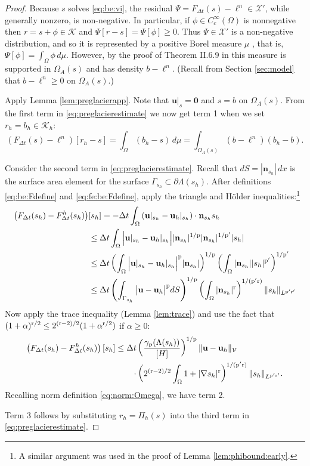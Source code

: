 \documentclass[hidelinks,onefignum,onetabnum,final]{siamart220329}  %
\newcommand{\grad}{\nabla}
\newcommand{\bn}{\mathbf{n}}
\newcommand{\bu}{\mathbf{u}}
\newcommand{\bzero}{\bm{0}}
\newcommand{\cK}{\mathcal{K}}
\newcommand{\cV}{\mathcal{V}}
\newcommand{\cX}{\mathcal{X}}
\newcommand{\pp}{{\text{\textnormal{p}}}}
\newcommand{\rr}{{\text{\textnormal{r}}}}
\begin{document}
\begin{proof}  Because $s$ solves \eqref{eq:be:vi}, the residual $\Psi = F_{\Delta t}(s)-\ell^n \in \cX'$, while generally nonzero, is non-negative.  In particular, if $\phi\in C_c^\infty(\Omega)$ is nonnegative then $r=s+\phi \in \cK$ and $\Psi[r-s] = \Psi[\phi] \ge 0$.  Thus $\Psi\in\cX'$ is a non-negative distribution, and so it is represented by a positive Borel measure $\mu$ \cite[Theorem 6.22]{LiebLoss1997}, that is, $\Psi[\phi] = \int_\Omega \phi\,d\mu$.  However, by the proof of Theorem II.6.9 in \cite{KinderlehrerStampacchia1980} this measure is supported in $\Omega_A(s)$ and has density $b-\ell^n$.  (Recall from Section \ref{sec:model} that $b-\ell^n\ge 0$ on $\Omega_A(s)$.)

Apply Lemma \ref{lem:preglacierapp}.  Note that $\bu|_{s}=\bzero$ and $s=b$ on $\Omega_A(s)$.  From the first term in \eqref{eq:preglacierestimate} we now get term 1 when we set $r_h = b_h \in \cK_h$:
\begin{equation}
\left(F_{\Delta t}(s)-\ell^n\right)[r_h-s] = \int_\Omega (b_h - s) \,d\mu = \int_{\Omega_A(s)} \left(b - \ell^n\right) (b_h - b).
\end{equation}

Consider the second term in \eqref{eq:preglacierestimate}.  Recall that $dS = |\bn_{s_h}|\,dx$ is the surface area element for the surface $\Gamma_{s_h} \subset \partial \Lambda(s_h)$.  After definitions \eqref{eq:be:Fdefine} and \eqref{eq:fe:be:Fdefine}, apply the triangle and H\"older inequalities:\footnote{A similar argument was used in the proof of Lemma \ref{lem:phibound:early}.}
\begin{align}
\left(F_{\Delta t}(s_h)-F^h_{\Delta t}(s_h)\right)&[s_h] = - \Delta t \int_\Omega \left(\bu|_{s_h} - \bu_h|_{s_h}\right)\cdot \bn_{s_h} s_h  \\
  &\le \Delta t \int_\Omega \Big|\bu|_{s_h} - \bu_h|_{s_h}\Big| |\bn_{s_h}|^{1/\pp} |\bn_{s_h}|^{1/\pp'} |s_h| \notag \\
  &\le \Delta t \left(\int_\Omega \Big|\bu|_{s_h} - \bu_h|_{s_h}\Big|^\pp |\bn_{s_h}|\right)^{1/\pp} \left(\int_\Omega |\bn_{s_h}| |s_h|^{\pp'}\right)^{1/\pp'} \notag \\
  &\le \Delta t \left(\int_{\Gamma_{s_h}} \big|\bu - \bu_h\big|^\pp dS\right)^{1/\pp} \left(\int_\Omega |\bn_{s_h}|^\rr\right)^{1/(\pp'\rr)} \|s_h\|_{L^{\pp'\rr'}} \notag
\end{align}
Now apply the trace inequality (Lemma \ref{lem:trace}) and use the fact that $(1+\alpha)^{\rr/2} \le 2^{(\rr-2)/2} (1+\alpha^{\rr/2})$ if $\alpha\ge 0$:
\begin{align}
\left(F_{\Delta t}(s_h)-F^h_{\Delta t}(s_h)\right)[s_h] &\le \Delta t \left(\frac{\gamma_\pp(\Lambda(s_h))}{[H]}\right)^{1/\pp} \|\bu - \bu_h\|_{\cV} \\
  &\qquad \cdot \left(2^{(\rr-2)/2} \int_\Omega 1 + |\grad s_h|^\rr\right)^{1/(\pp'\rr)} \|s_h\|_{L^{\pp'\rr'}}.  \notag
\end{align}
Recalling norm definition \eqref{eq:norm:Omega}, we have term 2.

Term 3 follows by substituting $r_h=\Pi_h(s)$ into the third term in \eqref{eq:preglacierestimate}.
\end{proof}
\end{document}
